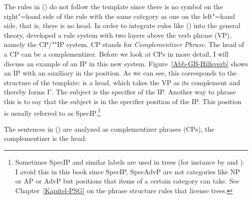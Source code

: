 The rules in () do not follow the \xbar template since there is no symbol on the right"=hand side of the rule with the same
category as one on the left"=hand side, that is, there is no head. In order to integrate rules like
() into the general theory, \citet[]{Chomsky86b} developed a rule system with
two layers above the verb phrase (VP), namely the CP/""IP system. CP stands for \emph{Complementizer Phrase}.
The head of a CP can be a complementizer. Before we look at CPs in more detail, I will discuss an example of an IP in this new system. 
Figure~\vref{Abb-GB-Hilfsverb} shows an IP with an auxiliary in the \inull position. As we can see, this corresponds to the structure of
the \xbar template: \inull is a head, which takes the VP as its complement and thereby forms I$'$. The subject is the specifier 
of the IP. Another way to phrase this is to say that the subject is in the specifier position of the
IP. This position is usually referred to as SpecIP.\footnote{\label{fn-specxp-in-trees}%
  Sometimes SpecIP and similar labels are used in trees (for instance by \citet{Meinunger2000a} and \citet{Lohnstein2014a}). I
  avoid this in this book since SpecIP, SpecAdvP are not categories like NP or AP or AdvP but
  positions that items of a certain category can take. See Chapter~\ref{Kapitel-PSG} on the phrase
  structure rules that license trees.
}
%

The sentences in () are analyzed as complementizer phrases (CPs), the complementizer is the head:

